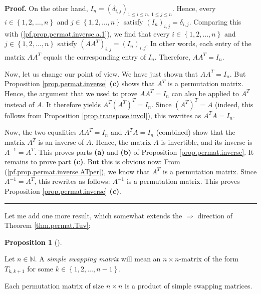 \documentclass[numbers=enddot,12pt,final,onecolumn,notitlepage]{scrartcl}%
\theoremstyle{definition}
\newtheorem{prop}[theo]{Proposition}
\newenvironment{proposition}[1][]
{\begin{prop}[#1]\begin{leftbar}}
{\end{leftbar}\end{prop}}
\newenvironment{proof}[1][Proof]{\noindent\textbf{#1.} }{\ \rule{0.5em}{0.5em}}
\begin{document}
\begin{proof}
On the other hand, $I_{n}=\left(  \delta_{i,j}\right)  _{1\leq i\leq n,\ 1\leq
j\leq n}$. Hence, every $i\in\left\{  1,2,\ldots,n\right\}  $ and
$j\in\left\{  1,2,\ldots,n\right\}  $ satisfy $\left(  I_{n}\right)
_{i,j}=\delta_{i,j}$. Comparing this with (\ref{pf.prop.permat.inverse.a.1}),
we find that every $i\in\left\{  1,2,\ldots,n\right\}  $ and $j\in\left\{
1,2,\ldots,n\right\}  $ satisfy $\left(  AA^{T}\right)  _{i,j}=\left(
I_{n}\right)  _{i,j}$. In other words, each entry of the matrix $AA^{T}$
equals the corresponding entry of $I_{n}$. Therefore, $AA^{T}=I_{n}$.

Now, let us change our point of view. We have just shown that $AA^{T}=I_{n}$.
But Proposition \ref{prop.permat.inverse} \textbf{(c)} shows that $A^{T}$ is a
permutation matrix. Hence, the argument that we used to prove $AA^{T}=I_{n}$
can also be applied to $A^{T}$ instead of $A$. It therefore yields
$A^{T}\left(  A^{T}\right)  ^{T}=I_{n}$. Since $\left(  A^{T}\right)  ^{T}=A$
(indeed, this follows from Proposition \ref{prop.transpose.invol}), this
rewrites as $A^{T}A=I_{n}$.

Now, the two equalities $AA^{T}=I_{n}$ and $A^{T}A=I_{n}$ (combined) show that
the matrix $A^{T}$ is an inverse of $A$. Hence, the matrix $A$ is invertible,
and its inverse is $A^{-1}=A^{T}$. This proves parts \textbf{(a)} and
\textbf{(b)} of Proposition \ref{prop.permat.inverse}. It remains to prove
part \textbf{(c)}. But this is obvious now: From
(\ref{pf.prop.permat.inverse.ATper}), we know that $A^{T}$ is a permutation
matrix. Since $A^{-1}=A^{T}$, this rewrites as follows: $A^{-1}$ is a
permutation matrix. This proves Proposition \ref{prop.permat.inverse}
\textbf{(c)}.
\end{proof}

Let me add one more result, which somewhat extends the $\Longrightarrow$
direction of Theorem \ref{thm.permat.Tuv}:

\begin{proposition}
\label{prop.permat.Tkk+1}Let $n\in\mathbb{N}$. A \textit{simple swapping
matrix} will mean an $n\times n$-matrix of the form $T_{k,k+1}$ for some
$k\in\left\{  1,2,\ldots,n-1\right\}  $.

Each permutation matrix of size $n\times n$ is a product of simple swapping matrices.
\end{proposition}
\end{document}
